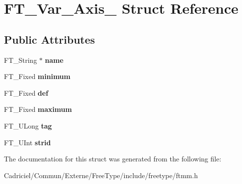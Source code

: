 \hypertarget{struct_f_t___var___axis__}{\section{F\-T\-\_\-\-Var\-\_\-\-Axis\-\_\- Struct Reference}
\label{struct_f_t___var___axis__}
}
\subsection*{Public Attributes}
\begin{DoxyCompactItemize}
\item 
\hypertarget{struct_f_t___var___axis___a8d0e0af322a692999ec3733a3e18a5a4}{F\-T\-\_\-\-String $\ast$ {\bfseries name}}\label{struct_f_t___var___axis___a8d0e0af322a692999ec3733a3e18a5a4}

\item 
\hypertarget{struct_f_t___var___axis___aae13a8dea1c96bc3949019e8117e7edb}{F\-T\-\_\-\-Fixed {\bfseries minimum}}\label{struct_f_t___var___axis___aae13a8dea1c96bc3949019e8117e7edb}

\item 
\hypertarget{struct_f_t___var___axis___a37a6ca4188a6bfd95d9d06538bf1a3dd}{F\-T\-\_\-\-Fixed {\bfseries def}}\label{struct_f_t___var___axis___a37a6ca4188a6bfd95d9d06538bf1a3dd}

\item 
\hypertarget{struct_f_t___var___axis___a5704641439e9f318cf3c2b73864e3260}{F\-T\-\_\-\-Fixed {\bfseries maximum}}\label{struct_f_t___var___axis___a5704641439e9f318cf3c2b73864e3260}

\item 
\hypertarget{struct_f_t___var___axis___a01ef9396e34e740c2d2b8c7117094624}{F\-T\-\_\-\-U\-Long {\bfseries tag}}\label{struct_f_t___var___axis___a01ef9396e34e740c2d2b8c7117094624}

\item 
\hypertarget{struct_f_t___var___axis___a297d28ab0f5666e56d7575249ccc75d7}{F\-T\-\_\-\-U\-Int {\bfseries strid}}\label{struct_f_t___var___axis___a297d28ab0f5666e56d7575249ccc75d7}

\end{DoxyCompactItemize}


The documentation for this struct was generated from the following file\-:\begin{DoxyCompactItemize}
\item 
Cadriciel/\-Commun/\-Externe/\-Free\-Type/include/freetype/ftmm.\-h\end{DoxyCompactItemize}
